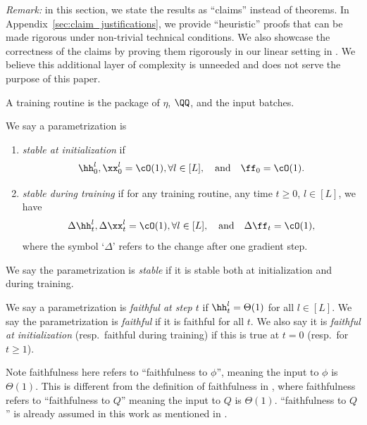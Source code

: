 \emph{Remark:} in this section, we state the results as ``claims'' instead of theorems. In Appendix~\ref{sec:claim_justifications}, we provide ``heuristic'' proofs that can be made rigorous under non-trivial technical conditions. We also showcase the correctness of the claims by proving them rigorously in our linear setting in . We believe this additional layer of complexity is unneeded and does not serve the purpose of this paper. 

\begin{defn}\label{defn:training_routine}
    A training routine is the package of $\eta$, $\QQ$, and the input batches.
\end{defn}

\begin{defn}[Stability]\label{defn:stability} 
    We say a parametrization is
    \begin{enumerate}
    \item \emph{stable at initialization} if %
    \begin{equation}
    \hh_{0}^{l},\xx_{0}^{l}=\cO(1),\forall l\in[L],\quad\text{and}\quad \ff_{0}=\cO(1).\label{eq:initstable}
    \end{equation}
    \item \emph{stable during training} if for any training routine, any time $t\ge0$, $l\in[L]$, we have 
    \[
    \Delta \hh_{t}^{l},\Delta \xx_{t}^{l}=\cO(1),\forall l\in[L],\quad\text{and}\quad \Delta\ff_{t}=\cO(1),
    \]
     where the symbol `$\Delta$' refers to the change after one gradient step.\\
    \end{enumerate}
   
    We say the parametrization is \emph{stable} if it is stable both at initialization and during training.
\end{defn}

\begin{defn}[Faithful]\label{defn:faithful} 
    We say a parametrization is \emph{faithful at step $t$} if $\hh_{t}^{l}=\Theta(1)$ for all $l\in[L]$.
    We say the parametrization is \emph{faithful} if it is faithful for all $t$.
    We also say it is \emph{faithful at initialization} (resp.\ faithful during training) if this is true at $t = 0$ (resp.\ for $t \ge 1$).
\end{defn}
Note faithfulness here refers to ``faithfulness to $\phi$'', meaning the input to $\phi$ is $\Theta(1)$. This is different from the definition of faithfulness in \citet{yang2023tensor}, where faithfulness refers to ``faithfulness to $Q$'' meaning the input to $Q$ is $\Theta(1)$. ``faithfulness to $Q$'' is already assumed in this work as mentioned in .

